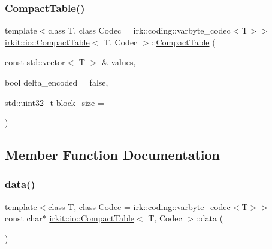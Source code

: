 \subsubsection{\texorpdfstring{Compact\+Table()}{CompactTable()}\hspace{0.1cm}{\footnotesize\ttfamily [2/2]}}
{\footnotesize\ttfamily template$<$class T, class Codec = irk\+::coding\+::varbyte\+\_\+codec$<$\+T$>$$>$ \\
\mbox{\hyperlink{classirkit_1_1io_1_1CompactTable}{irkit\+::io\+::\+Compact\+Table}}$<$ T, Codec $>$\+::\mbox{\hyperlink{classirkit_1_1io_1_1CompactTable}{Compact\+Table}} (\begin{DoxyParamCaption}\item[{const std\+::vector$<$ T $>$ \&}]{values,  }\item[{bool}]{delta\+\_\+encoded = {\ttfamily false},  }\item[{std\+::uint32\+\_\+t}]{block\+\_\+size = {} }\end{DoxyParamCaption})\hspace{0.3cm}{\ttfamily [inline]}}



\subsection{Member Function Documentation}
\mbox{\label{classirkit_1_1io_1_1CompactTable_af89d3739131899e8db186c2d0e625627}} 
\subsubsection{\texorpdfstring{data()}{data()}}
{\footnotesize\ttfamily template$<$class T, class Codec = irk\+::coding\+::varbyte\+\_\+codec$<$\+T$>$$>$ \\
const char$\ast$ \mbox{\hyperlink{classirkit_1_1io_1_1CompactTable}{irkit\+::io\+::\+Compact\+Table}}$<$ T, Codec $>$\+::data (\begin{DoxyParamCaption}{ }\end{DoxyParamCaption})\hspace{0.3cm}{\ttfamily [inline]}}

\mbox{\label{classirkit_1_1io_1_1CompactTable_a50d7642c78dc73fd7cfdce870e667603}} 
